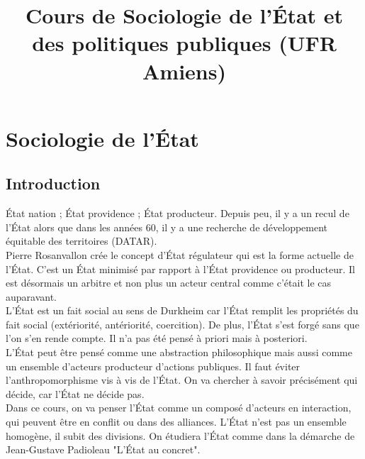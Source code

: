 \documentclass[10pt, a4paper, openany]{book}
\date{}
\title{Cours de Sociologie de l'État et des politiques publiques (UFR Amiens)}
\begin{document}
\maketitle
\tableofcontents

\part{Sociologie de l'État}

\chapter{Introduction}

État nation ; État providence ; État producteur. Depuis peu, il y a un recul de l'État alors que dans les années 60, il y a une recherche de développement équitable des territoires (DATAR). \\
Pierre Rosanvallon crée le concept d'État régulateur qui est la forme actuelle de l'État. C'est un État minimisé par rapport à l'État providence ou producteur. Il est désormais un arbitre et non plus un acteur central comme c'était le cas auparavant. \\
L'État est un fait social au sens de Durkheim car l'État remplit les propriétés du fait social (extériorité, antériorité, coercition). De plus, l'État s'est forgé sans que l'on s'en rende compte. Il n'a pas été pensé à priori mais à posteriori. \\
L'État peut être pensé comme une abstraction philosophique mais aussi comme un ensemble d'acteurs producteur d'actions publiques. Il faut éviter l'anthropomorphisme vis à vis de l'État. On va chercher à savoir précisément qui décide, car l'État ne décide pas. \\
Dans ce cours, on va penser l'État comme un composé d'acteurs en interaction, qui peuvent être en conflit ou dans des alliances. L'État n'est pas un ensemble homogène, il subit des divisions. On étudiera l'État comme dans la démarche de Jean-Gustave Padioleau "L'État au concret". 
\end{document}
